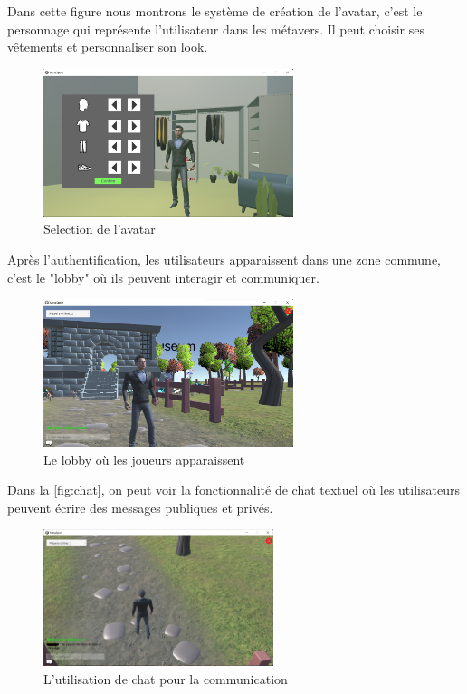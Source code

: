 \documentclass[12pt,a4paper,oneside,french]{book}
\begin{document}
Dans cette figure nous montrons le système de création de l’avatar, c’est le personnage qui
représente l'utilisateur dans les métavers. Il peut choisir ses vêtements et personnaliser son look.
\begin{figure}[H]
    \centering
    \includegraphics[width=0.65\textwidth]{figure/char.png}
    \caption{Selection de l'avatar}
    \label{fig:char}
\end{figure}
\noindent

Après l’authentification, les utilisateurs apparaissent dans une zone commune, c’est le "lobby" où ils peuvent interagir et communiquer.
\begin{figure}[H]
    \centering
    \includegraphics[width=0.65\textwidth]{figure/lobby.png}
    \caption{Le lobby où les joueurs apparaissent}
    \label{fig:lobby}
\end{figure}
\noindent

Dans la \autoref{fig:chat}, on peut voir la fonctionnalité de chat textuel où les utilisateurs peuvent écrire des messages publiques et privés.
\begin{figure}[H]
    \centering
    \includegraphics[width=0.6\textwidth]{figure/chat.png}
    \caption{L’utilisation de chat pour la communication}
    \label{fig:chat}
\end{figure}
\noindent
\end{document}
